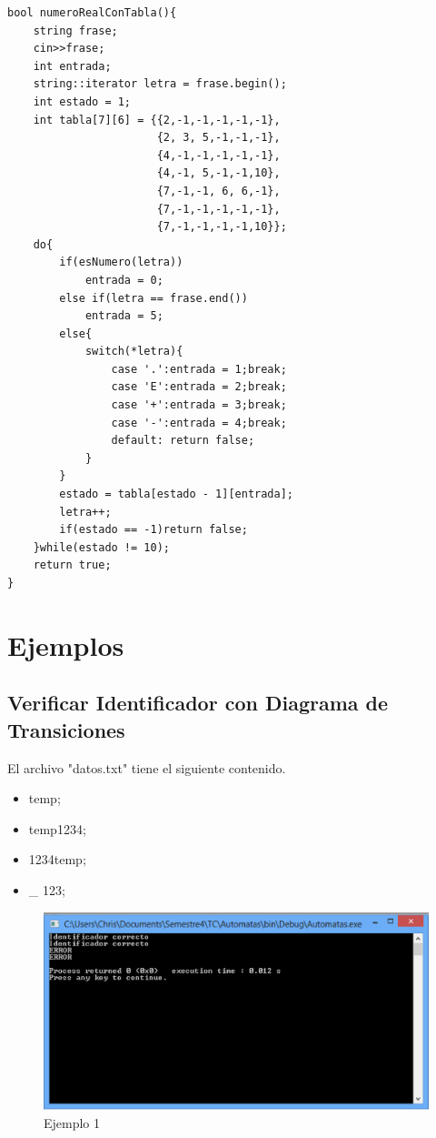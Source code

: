 \documentclass[a4paper,12pt]{article}
\begin{document}
\begin{lstlisting}
bool numeroRealConTabla(){
    string frase;
    cin>>frase;
    int entrada;
    string::iterator letra = frase.begin();
    int estado = 1;
    int tabla[7][6] = {{2,-1,-1,-1,-1,-1},
                       {2, 3, 5,-1,-1,-1},
                       {4,-1,-1,-1,-1,-1},
                       {4,-1, 5,-1,-1,10},
                       {7,-1,-1, 6, 6,-1},
                       {7,-1,-1,-1,-1,-1},
                       {7,-1,-1,-1,-1,10}};
    do{
        if(esNumero(letra))
            entrada = 0;
        else if(letra == frase.end())
            entrada = 5;
        else{
            switch(*letra){
                case '.':entrada = 1;break;
                case 'E':entrada = 2;break;
                case '+':entrada = 3;break;
                case '-':entrada = 4;break;
                default: return false;
            }
        }
        estado = tabla[estado - 1][entrada];
        letra++;
        if(estado == -1)return false;
    }while(estado != 10);
    return true;
}

\end{lstlisting}

\section{Ejemplos}

\subsection{Verificar Identificador con Diagrama de Transiciones}

El archivo "datos.txt" tiene el siguiente contenido.

\begin{itemize}
\item temp;
\item temp1234;
\item 1234temp;
\item \_ 123;
\end{itemize}

\newpage

\begin{figure}[h]
\centering
\includegraphics[scale=0.5]{imagenes/1.eps}
\caption{Ejemplo 1}
\end{figure}
\end{document}
